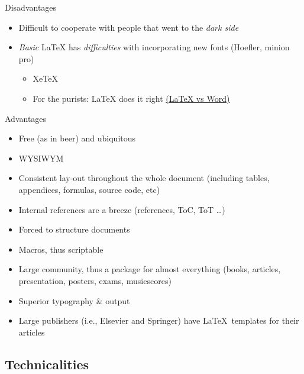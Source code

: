 \documentclass[ignorenonframetext]{beamer}
\begin{document}
{\begin{frame}{Disadvantages}
\begin{itemize}
  \begin{itemize}
  \item
    Learning curve, but
  \item
    hurray for
    \href{https://wch.github.io/latexsheet/latexsheet.pdf}{cheat sheets}
    and Google
  \end{itemize}
\item
  Difficult to cooperate with people that went to the \emph{dark side}
\item
  \emph{Basic} \LaTeX{} has \emph{difficulties} with incorporating new
  fonts (Hoefler, minion pro)

  \begin{itemize}
  \item
    XeTeX  \item
    For the purists: \LaTeX{} does it right
    \href{http://oestrem.com/thingstwice/2007/05/latex-vs-word-vs-writer/}{(\LaTeX{}
    vs Word)}
  \end{itemize}
\end{itemize}

\end{frame}

\begin{frame}{Advantages}

\begin{itemize}
\item
  Free (as in beer) and ubiquitous
\item
  WYSIWYM
\item
  Consistent lay-out throughout the whole document (including tables,
  appendices, formulas, source code, etc)
\item
  Internal references are a breeze (references, ToC, ToT \ldots{})
\item
  Forced to structure documents
\item
  Macros, thus scriptable
\item
  Large community, thus a package for almost everything (books,
  articles, presentation, posters, exams, musicscores)
\item
  Superior typography \& output
\item
  Large publishers (i.e., Elsevier and Springer) have \LaTeX~templates
  for their articles
\end{itemize}

\end{frame}

\subsection{Technicalities}\label{technicalities}

}
\end{document}

